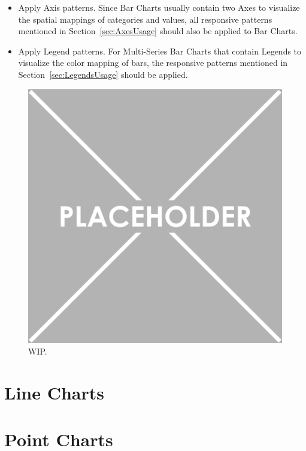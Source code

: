 \begin{itemize}
\item
Apply Axis patterns.
Since Bar Charts usually contain two Axes to visualize the spatial mappings of categories and values, all responsive patterns mentioned in Section~\ref{sec:AxesUsage} should also be applied to Bar Charts.

\item
Apply Legend patterns.
For Multi-Series Bar Charts that contain Legends to visualize the color mapping of bars, the responsive patterns mentioned in Section~\ref{sec:LegendsUsage} should be applied.

\end{itemize}


\begin{samepage}
%
    WIP
  },
]{listings/bar-chart-patterns.html}
\end{samepage}

\begin{figure}[tp]
\centering
\includegraphics[keepaspectratio,width=\linewidth,height=\fullh]{images/placeholder.png}
\caption[Results of Responsive Patterns Targeting Bar Charts]{
  WIP.
}
\label{fig:BarChartPatterns}
\end{figure}

\section{Line Charts}
\label{sec:LineChartsUsage}

\section{Point Charts}
\label{sec:PointChartsUsage}
